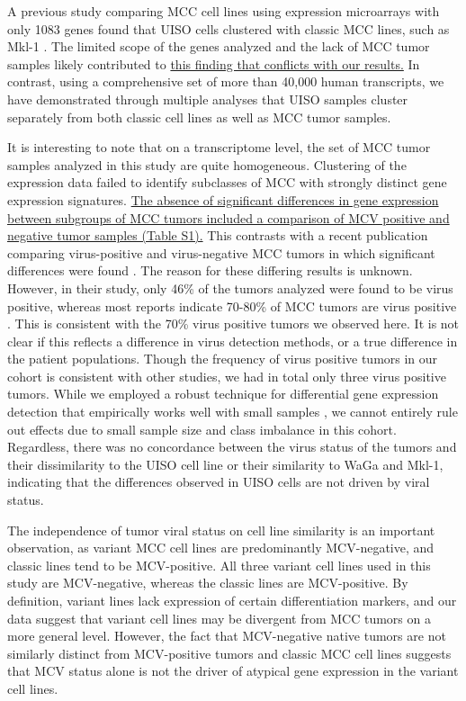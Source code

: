 \documentclass[10pt]{article}
\begin{document}
A previous study comparing MCC cell lines using expression microarrays with only 1083 genes found that UISO cells clustered with classic MCC lines, such as Mkl-1 \citep{VanGele2004Geneexpression}.
The limited scope of the genes analyzed and the lack of MCC tumor samples likely contributed to \uline{this finding that conflicts with our results.}
In contrast, using a comprehensive set of more than 40,000 human transcripts, we have demonstrated through multiple analyses that UISO samples cluster separately from both classic cell lines as well as MCC tumor samples.

It is interesting to note that on a transcriptome level, the set of MCC tumor samples analyzed in this study are quite homogeneous.
Clustering of the expression data failed to identify subclasses of MCC with strongly distinct gene expression signatures.
\uline{The absence of significant differences in gene expression between subgroups of MCC tumors included a comparison of MCV positive and negative tumor samples (Table S1).}
This contrasts with a recent publication comparing virus-positive and virus-negative MCC tumors in which significant differences were found \citep{Harms2013Distinct}.
The reason for these differing results is unknown.
However, in their study, only 46\% of the tumors analyzed were found to be virus positive, whereas most reports indicate 70-80\% of MCC tumors are virus positive \citep{Pulitzer2009Merkel,Feng2008Clonal}.
This is consistent with the 70\% virus positive tumors we observed here.
It is not clear if this reflects a difference in virus detection methods, or a true difference in the patient populations.
Though the frequency of virus positive tumors in our cohort is consistent with other studies, we had in total only three virus positive tumors.
While we employed a robust technique for differential gene expression detection that empirically works well with small samples \citep{Smyth2004Linear,Smyth2005Limma}, we cannot entirely rule out effects due to small sample size and class imbalance in this cohort.
Regardless, there was no concordance between the virus status of the tumors and their dissimilarity to the UISO cell line or their similarity to WaGa and Mkl-1, indicating that the differences observed in UISO cells are not driven by viral status.

The independence of tumor viral status on cell line similarity is an important observation, as variant MCC cell lines are predominantly MCV-negative, and classic lines tend to be MCV-positive. 
All three variant cell lines used in this study are MCV-negative, whereas the classic lines are MCV-positive.
By definition, variant lines lack expression of certain differentiation markers, and our data suggest that variant cell lines may be divergent from MCC tumors on a more general level. 
However, the fact that MCV-negative native tumors are not similarly distinct from MCV-positive tumors and classic MCC cell lines suggests that MCV status alone is not the driver of atypical gene expression in the variant cell lines.
\end{document}
